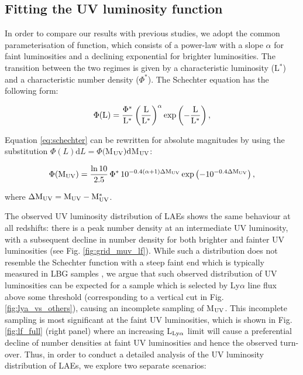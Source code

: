 \documentclass[a4paper,fleqn,usenatbib]{mnras}
\begin{document}
\subsection{Fitting the UV luminosity function} \label{subsec:muv_lf}

In order to compare our results with previous studies, we adopt the common parameterisation of \cite{Schechter1976} function, which consists of a power-law with a slope $\alpha$ for faint luminosities and a declining exponential for brighter luminosities. The transition between the two regimes is given by a characteristic luminosity (L$^*$) and a characteristic number density ($\Phi^*$). The Schechter equation has the following form:

\begin{eqnarray}
\rm \Phi(L)=\frac{\Phi^*}{L^*}\left(\frac{L}{L^*} \right)^\alpha \exp\left(-\frac{L}{L^*}\right),
\end{eqnarray} \label{eq:schechter}

Equation \ref{eq:schechter} can be rewritten for absolute magnitudes by using the substitution $\Phi(L)\mathrm{d}L=\Phi($M$_{\rm UV})\mathrm{d}$M$_{\rm UV}$:

\begin{eqnarray}
\Phi(\rm M_{\rm UV})=\frac{\ln 10}{2.5}\,\Phi^*\,10^{-0.4(\alpha+1)\Delta M_{\rm UV}}\exp\left(-10^{-0.4\Delta M_{\rm UV}}\right),
\end{eqnarray}

\noindent where $\rm \Delta M_{\rm UV}=M_{\rm UV}-M_{\rm UV}^*$. 

The observed UV luminosity distribution of LAEs shows the same behaviour at all redshifts: there is a peak number density at an intermediate UV luminosity, with a subsequent decline in number density for both brighter and fainter UV luminosities (see Fig. \ref{fig:grid_muv_lf}). While such a distribution does not resemble the Schechter function with a steep faint end which is typically measured in LBG samples \citep[e.g.][]{Bouwens2015,Finkelstein2015}, we argue that such observed distribution of UV luminosities can be expected for a sample which is selected by Ly$\alpha$ line flux above some threshold (corresponding to a vertical cut in Fig. \ref{fig:lya_vs_others}), causing an incomplete sampling of M$_{\rm UV}$. This incomplete sampling is most significant at the faint UV luminosities, which is shown in Fig. \ref{fig:lf_full} (right panel) where an increasing L$_{\rm Ly\alpha}$ limit will cause a preferential decline of number densities at faint UV luminosities and hence the observed turn-over. Thus, in order to conduct a detailed analysis of the UV luminosity distribution of LAEs, we explore two separate scenarios:
\end{document}
